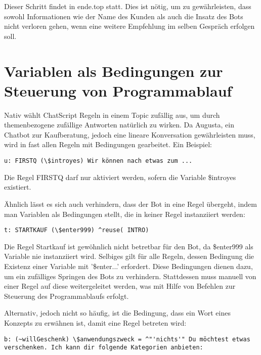 Dieser Schritt findet in ende.top statt. Dies ist nötig, um zu gewährleisten, dass sowohl Informationen wie der Name des Kunden als auch die Insatz des Bots nicht verloren gehen, wenn eine weitere Empfehlung im selben Gespräch erfolgen soll. 


\section{Variablen als Bedingungen zur Steuerung von Programmablauf}
\label{sec:ChatScript: Variablen als Bedingungen zur Steuerung von Programmablauf}

Nativ wählt ChatScript Regeln in einem Topic zufällig aus, um durch themenbezogene zufällige Antworten natürlich zu wirken. Da Augusta, ein Chatbot zur Kaufberatung, jedoch eine lineare Konversation gewährleisten muss, wird in fast allen Regeln mit Bedingungen gearbeitet. Ein Beispiel: 

\begin{lstlisting}[caption={Regelkopf von FIRSTQ in kaufabsicht.top}]
u: FIRSTQ (\$introyes) Wir können nach etwas zum ... 
\end{lstlisting}

Die Regel FIRSTQ darf nur aktiviert werden, sofern die Variable \$introyes existiert. 

Ähnlich lässt es sich auch verhindern, dass der Bot in eine Regel übergeht, indem man Variablen als Bedingungen stellt, die in keiner Regel instanziiert werden:

\begin{lstlisting}[caption={Regelkopf von STARTKAUF in kaufabsicht.top}]
t: STARTKAUF (\$enter999) ^reuse( INTRO)
\end{lstlisting}

Die Regel Startkauf ist gewöhnlich nicht betretbar für den Bot, da \$enter999 als Variable nie instanziiert wird. Selbiges gilt für alle Regeln, dessen Bedingung die Existenz einer Variable mit '\$enter...' erfordert. Diese Bedingungen dienen dazu, um ein zufälliges Springen des Bots zu verhindern. \textcolor[rgb]{1,0.41,0.13}{Stattdessen} muss manuell von einer Regel auf diese weitergeleitet werden, was mit Hilfe von Befehlen zur Steuerung des Programmablaufs erfolgt. 

Alternativ, jedoch nicht so häufig, ist die Bedingung, dass ein Wort eines Konzepts zu erwähnen ist, damit eine Regel betreten wird:

\begin{lstlisting}[caption={Regelkopf einer Regel in kaufabsicht.top}]
b: (~willGeschenk) \$anwendungszweck = ^"'nichts'" Du möchtest etwas verschenken. Ich kann dir folgende Kategorien anbieten:
\end{lstlisting}

